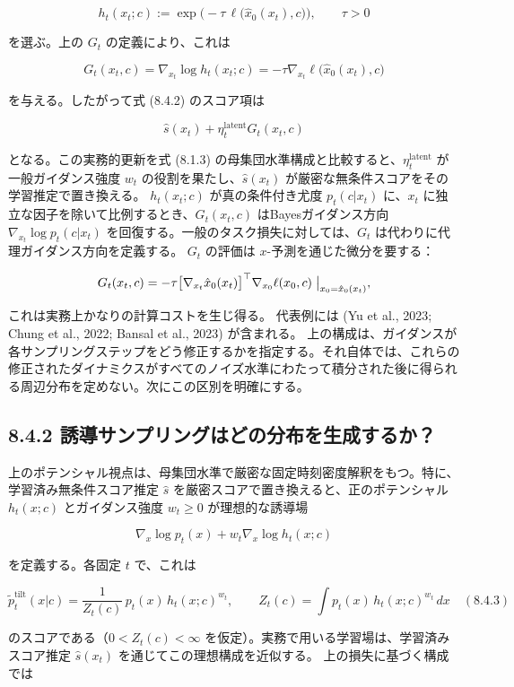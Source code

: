 \[
h_t(x_t;c):=\exp\bigl(-\tau\,\ell\bigl(\hat{x}_0(x_t),c\bigr)\bigr),\qquad\tau>0
\]


を選ぶ。上の $G_t$ の定義により、これは

\[
G_t(x_t,c)=\nabla_{x_t}\log h_t(x_t;c)=-\tau\nabla_{x_t}\ell\bigl(\hat{x}_0(x_t),c\bigr)
\]


を与える。したがって式 (8.4.2) のスコア項は

\[
\hat{s}(x_t)+\eta_t^{\mathrm{latent}}G_t(x_t,c)
\]


となる。この実務的更新を式 (8.1.3) の母集団水準構成と比較すると、$\eta_t^{\mathrm{latent}}$ が一般ガイダンス強度 $w_t$ の役割を果たし、$\hat{s}(x_t)$ が厳密な無条件スコアをその学習推定で置き換える。
$h_t(x_t;c)$ が真の条件付き尤度 $p_t(c|x_t)$ に、$x_t$ に独立な因子を除いて比例するとき、$G_t(x_t,c)$ はBayesガイダンス方向 $\nabla_{x_t}\log p_t(c|x_t)$ を回復する。一般のタスク損失に対しては、$G_t$ は代わりに代理ガイダンス方向を定義する。
$G_t$ の評価は $x$-予測を通じた微分を要する：

\[
G_t(x_t,c)=-\tau\bigl[\nabla_{x_t}\hat{x}_0(x_t)\bigr]^\top\nabla_{x_0}\ell(x_0,c)\bigm|_{x_0=\hat{x}_0(x_t)},
\]


これは実務上かなりの計算コストを生じ得る。
代表例には (Yu et al., 2023; Chung et al., 2022; Bansal et al., 2023) が含まれる。
上の構成は、ガイダンスが各サンプリングステップをどう修正するかを指定する。それ自体では、これらの修正されたダイナミクスがすべてのノイズ水準にわたって積分された後に得られる周辺分布を定めない。次にこの区別を明確にする。

\subsection*{8.4.2 誘導サンプリングはどの分布を生成するか？}


上のポテンシャル視点は、母集団水準で厳密な固定時刻密度解釈をもつ。特に、学習済み無条件スコア推定 $\hat{s}$ を厳密スコアで置き換えると、正のポテンシャル $h_t(x;c)$ とガイダンス強度 $w_t\ge 0$ が理想的な誘導場

\[
\nabla_x\log p_t(x)+w_t\nabla_x\log h_t(x;c)
\]


を定義する。各固定 $t$ で、これは

\[
\tilde{p}_t^{\mathrm{tilt}}(x|c)=\frac{1}{Z_t(c)}\,p_t(x)\,h_t(x;c)^{w_t},\qquad
Z_t(c)=\int p_t(x)\,h_t(x;c)^{w_t}\,dx \quad (8.4.3)
\]


のスコアである（$0<Z_t(c)<\infty$ を仮定）。実務で用いる学習場は、学習済みスコア推定 $\hat{s}(x_t)$ を通じてこの理想構成を近似する。
上の損失に基づく構成では

